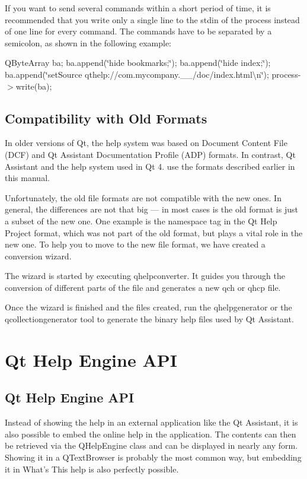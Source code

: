 If you want to send several commands within a short period of time, it is recommended that you write only a single line to the stdin of the process instead of one line for every command. The commands have to be separated by a semicolon, as shown in the following example\-:

Q\-Byte\-Array ba; ba.\-append(\char`\"{}hide bookmarks;\char`\"{}); ba.\-append(\char`\"{}hide index;\char`\"{}); ba.\-append(\char`\"{}set\-Source qthelp\-://com.\-mycompany.\-\_\-\_/doc/index.\-html\textbackslash{}n\char`\"{}); process-\/$>$write(ba);\hypertarget{assistant_assitant_compat}{}\subsection{Compatibility with Old Formats}\label{assistant_assitant_compat}
In older versions of Qt, the help system was based on Document Content File (D\-C\-F) and Qt Assistant Documentation Profile (A\-D\-P) formats. In contrast, Qt Assistant and the help system used in Qt 4. use the formats described earlier in this manual.

Unfortunately, the old file formats are not compatible with the new ones. In general, the differences are not that big — in most cases is the old format is just a subset of the new one. One example is the namespace tag in the Qt Help Project format, which was not part of the old format, but plays a vital role in the new one. To help you to move to the new file format, we have created a conversion wizard.

The wizard is started by executing qhelpconverter. It guides you through the conversion of different parts of the file and generates a new qch or qhcp file.

Once the wizard is finished and the files created, run the qhelpgenerator or the qcollectiongenerator tool to generate the binary help files used by Qt Assistant. \hypertarget{helpengine_api}{}\section{Qt Help Engine A\-P\-I}\label{helpengine_api}
\hypertarget{helpengine_api_helpengine_api}{}\subsection{Qt Help Engine A\-P\-I}\label{helpengine_api_helpengine_api}
Instead of showing the help in an external application like the Qt Assistant, it is also possible to embed the online help in the application. The contents can then be retrieved via the Q\-Help\-Engine class and can be displayed in nearly any form. Showing it in a Q\-Text\-Browser is probably the most common way, but embedding it in What's This help is also perfectly possible.

